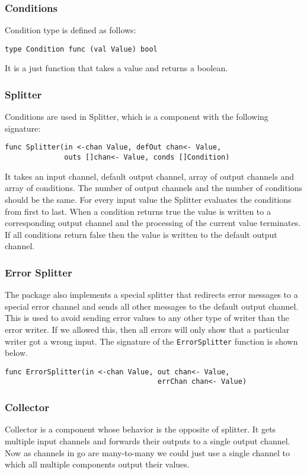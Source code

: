 \documentclass[12pt,a4paper]{article}
\begin{document}
\subsubsection{Conditions}
Condition type is defined as follows:
\begin{lstlisting}
type Condition func (val Value) bool
\end{lstlisting}
It is a just function that takes a value and returns a boolean.

\subsubsection{Splitter}
Conditions are used in Splitter, which is a component with the 
following signature:
\begin{lstlisting}
func Splitter(in <-chan Value, defOut chan<- Value, 
			  outs []chan<- Value, conds []Condition)
\end{lstlisting}
It takes an input channel, default output channel, array of output channels and array of conditions.
The number of output channels and the number of conditions should be the same.
For every input value the Splitter evaluates the conditions from first to last.
When a condition returns true the value is written to a corresponding output channel 
and the processing of the current value terminates. If all conditions return false
then the value is written to the default output channel.

\subsubsection{Error Splitter}
The package also implements a special splitter that redirects error messages
to a special error channel and sends all other messages to the default output 
channel. This is used to avoid sending error values to 
any other type of writer than the error writer. If we allowed this, then
all errors will only show that a particular writer got a wrong input.
The signature of the \texttt{ErrorSplitter} function is shown below.
\begin{lstlisting}
func ErrorSplitter(in <-chan Value, out chan<- Value, 
                                    errChan chan<- Value)
\end{lstlisting}

\subsubsection{Collector}
Collector is a component whose behavior is the opposite of splitter. 
It gets multiple input channels
and forwards their outputs to a single output channel. Now as channels
in go are many-to-many we could just use a single channel to which all
multiple components output their values. 
\end{document}
